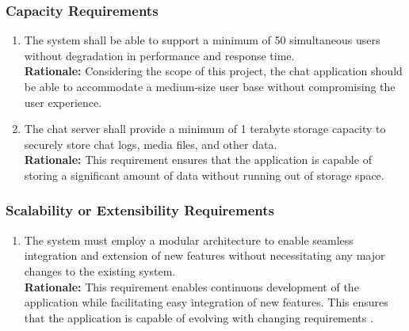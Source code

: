 \documentclass[]{article}
\begin{document}
\subsubsection{Capacity Requirements}
\label{ssub:capacity_requirements}
\begin{enumerate}[{PR-C}1. ]
    \item The system shall be able to support a minimum of 50 simultaneous users without degradation in performance and response time. \\
    {\bf Rationale:} Considering the scope of this project, the chat application should be able to accommodate a medium-size user base without 
    compromising the user experience. 
    \item The chat server shall provide a minimum of 1 terabyte storage capacity to securely store chat logs, media files, and other data. \\
    {\bf Rationale:} This requirement ensures that the application is capable of storing a significant amount of data without running out 
    of storage space. 
\end{enumerate} 
 
\subsubsection{Scalability or Extensibility Requirements}
\label{ssub:scalability_or_extensibility_requirements}
\begin{enumerate}[{PR-SE}1. ]
    \item The system must employ a modular architecture to enable seamless integration and extension of new features 
    without necessitating any major changes to the existing system. \\
    {\bf Rationale:} This requirement enables continuous development of the application while facilitating easy integration of new 
    features. This ensures that the application is capable of evolving with changing requirements 
    \cite{7c}.
\end{enumerate}
\end{document}
